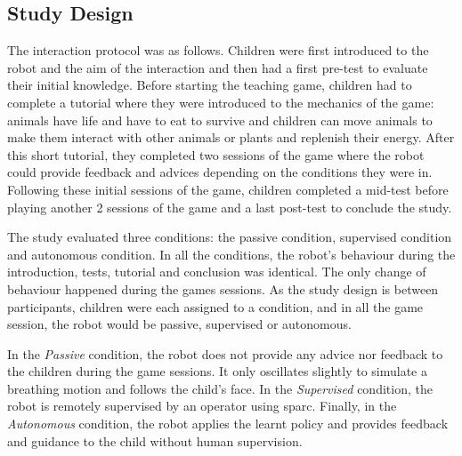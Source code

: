 \subsection{Study Design}

The interaction protocol was as follows. Children were first introduced to the robot and the aim of the interaction and then had a first pre-test to evaluate their initial knowledge. Before starting the teaching game, children had to complete a tutorial where they were introduced to the mechanics of the game: animals have life and have to eat to survive and children can move animals to make them interact with other animals or plants and replenish their energy. After this short tutorial, they completed two sessions of the game where the robot could provide feedback and advices depending on the conditions they were in. Following these initial sessions of the game, children completed a mid-test before playing another 2 sessions of the game and a last post-test to conclude the study. 


The study evaluated three conditions: the passive condition, supervised condition and autonomous condition. In all the conditions, the robot's behaviour during the introduction, tests, tutorial and conclusion was identical. The only change of behaviour happened during the games sessions. As the study design is between participants, children were each assigned to a condition, and in all the game session, the robot would be passive, supervised or autonomous. %

In the \textit{Passive} condition, the robot does not provide any advice nor feedback to the children during the game sessions. It only oscillates slightly to simulate a breathing motion and follows the child's face. In the \textit{Supervised} condition, the robot is remotely supervised by an operator using \gls{sparc}. Finally, in the \textit{Autonomous} condition, the robot applies the learnt policy and provides feedback and guidance to the child without human supervision.

